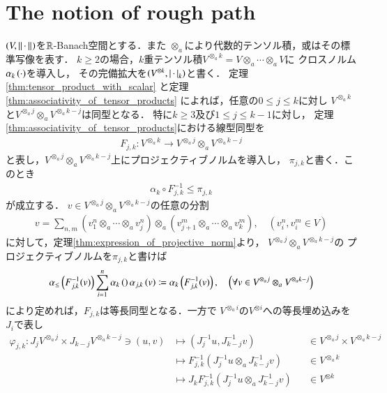\section{The notion of rough path}
	$(V,\Norm{\cdot}{})$を$\R$-Banach空間とする．また
	$\otimes_a$により代数的テンソル積，或はその標準写像を表す．
	$k \geq 2$の場合，$k$重テンソル積$V^{\otimes_a k} = V \otimes_a \cdots \otimes_a V$に
	クロスノルム$\crossnorm{\cdot}{k}$を導入し，
	その完備拡大を$(V^{\otimes k},\compcrossnorm{\cdot}{k})$と書く．
	定理\ref{thm:tensor_product_with_scalar}
	と定理\ref{thm:associativity_of_tensor_products}
	によれば，任意の$0 \leq j \leq k$に対し
	$V^{\otimes_a k}$と$V^{\otimes_a j} \otimes_a V^{\otimes_a k-j}$は同型となる．
	特に$k \geq 3$及び$1 \leq j \leq k-1$に対し，
	定理\ref{thm:associativity_of_tensor_products}における線型同型を
	\begin{align}
		F_{j,k}:V^{\otimes_a k} \longrightarrow V^{\otimes_a j} \otimes_a V^{\otimes_a k-j}
	\end{align}
	と表し，$V^{\otimes_a j} \otimes_a V^{\otimes_a k-j}$上にプロジェクティブノルムを導入し，
	$\pi_{j,k}$と書く．このとき
	\begin{align}
		\alpha_k \circ F^{-1}_{j,k} \leq \pi_{j,k}
	\end{align}
	が成立する．
	$v \in V^{\otimes_a j} \otimes_a V^{\otimes_a k-j}$の任意の分割
	\begin{align}
		v = \sum_{n,m} \left( v^n_1 \otimes_a \cdots \otimes_a v^n_j \right) 
		\otimes_a \left( v^m_{j+1} \otimes_a \cdots \otimes_a v^m_{k} \right),
		\quad (v^n_i,v^m_i \in V)
	\end{align}
	に対して，定理\ref{thm:expression_of_projective_norm}より，
	$V^{\otimes_a j} \otimes_a V^{\otimes_a k-j}$の
	プロジェクティブノルムを$\pi_{j,k}$と書けば
	\begin{align}
		\crossnorm{F_{j,k}^{-1}(v)} \leq \sum_{i=1}^n \crossnorm{}{k}
		\crossnorm{v}{j,k} \coloneqq \crossnorm{F_{j,k}^{-1}(v)}{k},
		\quad \left( \forall v \in V^{\otimes_a j} \otimes_a V^{\otimes_a k-j} \right)
	\end{align}
	により定めれば，$F_{j,k}$は等長同型となる．一方で
	$V^{\otimes_a i}$の$V^{\otimes i}$への等長埋め込みを$J_i$で表し
	\begin{align}
		\varphi_{j,k}:J_j V^{\otimes_a j} \times J_{k-j} V^{\otimes_a k-j} \ni (u,v)
		& \longmapsto ( J_j^{-1}u,J_{k-j}^{-1}v ) &&\in V^{\otimes_a j} \times V^{\otimes_a k-j} \\
		& \longmapsto F_{j,k}^{-1} (J_j^{-1}u \otimes_a J_{k-j}^{-1}v) &&\in V^{\otimes_a k} \\
		& \longmapsto J_k F_{j,k}^{-1} (J_j^{-1}u \otimes_a J_{k-j}^{-1}v) &&\in V^{\otimes k}
	\end{align}
